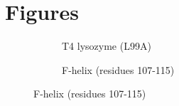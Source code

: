 \section*{Figures}

\begin{figure}[!ht]
\begin{subfigure}[t]{0.5\linewidth}
   \centering
   \caption{T4 lysozyme (L99A)}
   \label{fig:T4-L99A_protein}
\end{subfigure}\hfill
\centering
\begin{subfigure}[t]{0.5\linewidth}
  \centering
  \caption{F-helix (residues 107-115)}
  \label{fig:T4-L99A_tube}

\end{subfigure}
\end{figure}
